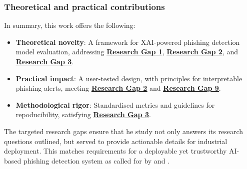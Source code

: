 
\subsubsection*{Theoretical and practical contributions}
In summary, this work offers the following:

\begin{itemize}
  \item \textbf{Theoretical novelty}: A framework for XAI-powered phishing detection model evaluation, addressing \hyperref[research-gap-1]{\uline{\textbf{Research Gap 1}}}, \hyperref[research-gap-2]{\uline{\textbf{Research Gap 2}}}, and \hyperref[research-gap-3]{\uline{\textbf{Research Gap 3}}}.
  \item \textbf{Practical impact}: A user-tested design, with principles for interpretable phishing alerts, meeting \hyperref[research-gap-2]{\uline{\textbf{Research Gap 2}}} and \hyperref[research-gap-9]{\uline{\textbf{Research Gap 9}}}.
  \item \textbf{Methodological rigor}: Standardised metrics and guidelines for repoducibility, satisfying \hyperref[research-gap-3]{\uline{\textbf{Research Gap 3}}}.
\end{itemize}

\noindent The targeted research gaps ensure that he study not only answers its research questions outlined, but served to provide actionable details for industrial deployment. This matches requirements for a deployable yet trustworthy AI-based phishing detection system as called for by \cite{atlam2022business} and \cite{lim2025explicate}.

